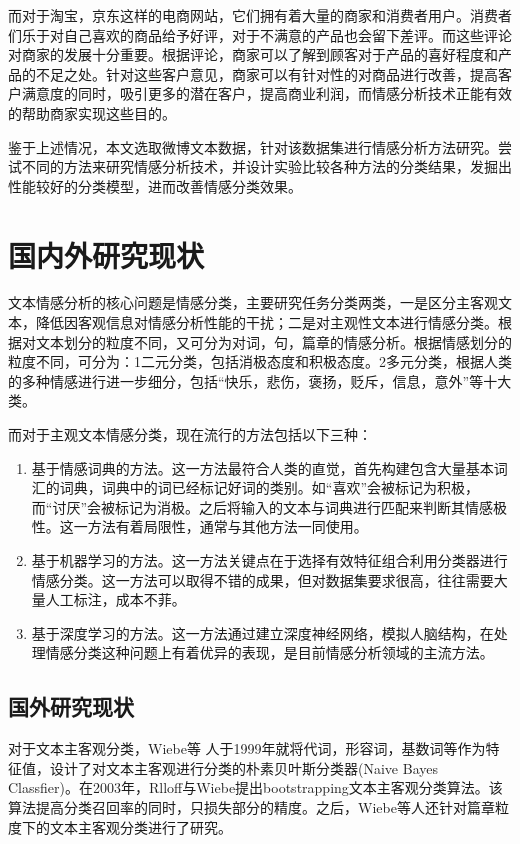 而对于淘宝，京东这样的电商网站，它们拥有着大量的商家和消费者用户。消费者们乐于对自己喜欢的商品给予好评，对于不满意的产品也会留下差评。而这些评论对商家的发展十分重要\cite{电商网站情感分析}。根据评论，商家可以了解到顾客对于产品的喜好程度和产品的不足之处。针对这些客户意见，商家可以有针对性的对商品进行改善，提高客户满意度的同时，吸引更多的潜在客户，提高商业利润，而情感分析技术正能有效的帮助商家实现这些目的。

鉴于上述情况，本文选取微博文本数据，针对该数据集进行情感分析方法研究。尝试不同的方法来研究情感分析技术，并设计实验比较各种方法的分类结果，发掘出性能较好的分类模型，进而改善情感分类效果。


\section{国内外研究现状}
文本情感分析的核心问题是情感分类，主要研究任务分类两类，一是区分主客观文本，降低因客观信息对情感分析性能的干扰；二是对主观性文本进行情感分类\cite{杨立公2013文本情感分析综述}。根据对文本划分的粒度不同，又可分为对词，句，篇章的情感分析。根据情感划分的粒度不同，可分为：{\large{\textcircled{\small{1}}}}二元分类，包括消极态度和积极态度。{\large{\textcircled{\small{2}}}}多元分类，根据人类的多种情感进行进一步细分，包括“快乐，悲伤，褒扬，贬斥，信息，意外”等十大类\cite{杨小平2017基于}。

而对于主观文本情感分类，现在流行的方法包括以下三种：
\begin{enumerate}[1)]
\item 基于情感词典的方法。这一方法最符合人类的直觉，首先构建包含大量基本词汇的词典，词典中的词已经标记好词的类别。如“喜欢”会被标记为积极，而“讨厌”会被标记为消极。之后将输入的文本与词典进行匹配来判断其情感极性。这一方法有着局限性，通常与其他方法一同使用。
\item 基于机器学习的方法。这一方法关键点在于选择有效特征组合利用分类器进行情感分类\cite{朱晓霞2019基于主题挖掘技术的文本情感分析综述}。这一方法可以取得不错的成果，但对数据集要求很高，往往需要大量人工标注，成本不菲。
\item 基于深度学习的方法。这一方法通过建立深度神经网络，模拟人脑结构，在处理情感分类这种问题上有着优异的表现，是目前情感分析领域的主流方法。
\end{enumerate}

\subsection{国外研究现状}
对于文本主客观分类，Wiebe等\cite{wiebe1999development} 人于1999年就将代词，形容词，基数词等作为特征值，设计了对文本主客观进行分类的朴素贝叶斯分类器(Naive Bayes Classfier)。在2003年，Rlloff与Wiebe\cite{riloff2003learning}提出bootstrapping文本主客观分类算法。该算法提高分类召回率的同时，只损失部分的精度。之后，Wiebe等\cite{wilson2005recognizing}人还针对篇章粒度下的文本主客观分类进行了研究。

